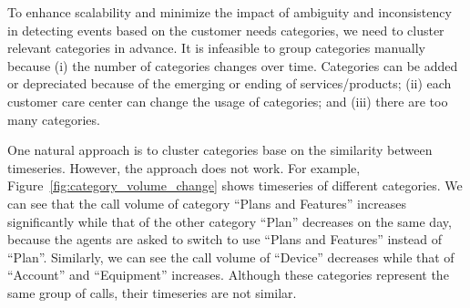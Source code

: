 To enhance scalability and minimize the
impact of ambiguity and inconsistency in detecting events based on the 
customer needs categories, we need to cluster relevant categories in advance.
It is infeasible to group categories manually because (i) the number of categories 
changes over time. Categories can be added or depreciated because of the emerging 
or ending of services/products; (ii) each customer care center can change the usage 
of categories; and (iii) there are too many categories. 

One natural approach is to cluster categories base on  the similarity
between timeseries. However, the approach does not work. 
For example, Figure~\ref{fig:category_volume_change} shows timeseries of different categories. 
We can see that the call volume of category ``Plans and Features'' increases significantly 
while that of the other category ``Plan'' decreases on the same day, because the agents are 
asked to switch to use ``Plans and Features'' instead of ``Plan''. 
Similarly, we can see the call volume of ``Device'' decreases while that of ``Account''
and ``Equipment'' increases. Although these categories represent the same group 
of calls, their timeseries are not similar.

